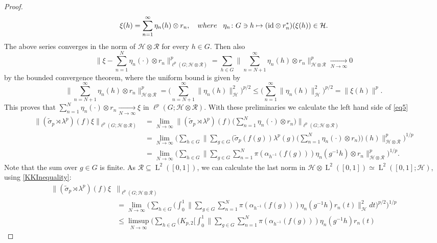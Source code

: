 \documentclass[10pt,a4paper]{amsart}
\DeclareMathOperator{\LL}{L}
\newcommand{\mc}{\mathcal}
\newcommand{\md}{d}
\newcommand{\wt}{\widetilde}
\begin{document}
\begin{proof}
\[
\xi(h)=
\sum_{n=1}^{\infty}  \eta_n(h)\otimes r_n,\quad
\textnormal{where}\;\;\;
\eta_n\colon G\ni h\mapsto(\mathrm{id}\otimes   r_n^*) (\xi(h))\in \mc{H}.
\]
The above series converges in the norm of $\mc{H}\otimes \mc{R}$ for every $h\in G$. Then also
\[
\bigl\|\xi-\sum_{n=1}^{N} \eta_n(\cdot)\otimes r_n\bigr\|_{\ell^p(G;\mc{H}\otimes\mc{R})}^p
=
\sum_{h\in G} \bigl\|
\sum_{n=N+1}^{\infty} \eta_n(h)\otimes r_n\bigr\|_{\mc{H}\otimes \mc{R}}^p \xrightarrow[N\to\infty]{}0
\]
by the bounded convergence theorem, where the uniform bound is given by
\[
\bigl\|
\sum_{n=N+1}^{\infty} \eta_n(h)\otimes r_n\bigr\|_{\mc{H}\otimes \mc{R}}^p=
\bigl(\sum_{n=N+1}^{\infty} \bigl\|\eta_n(h)\bigr\|_{\mc{H}}^{2 }\bigr)^{p/2}\le
\bigl(\sum_{n=1}^{\infty} \bigl\|\eta_n(h)\bigr\|_{\mc{H}}^{2}\bigr)^{p/2}=
\|\xi(h)\|^{p}.
\]
This proves that $\sum_{n=1}^{N} \eta_n(\cdot)\otimes r_n\xrightarrow[N\to\infty]{}\xi$ in $\ell^p(G;\mc{H}\otimes\mc{R})$. With these preliminaries we calculate the left hand side of \eqref{eq5}
\begin{align*}
\|(\wt{\sigma}_p\rtimes\lambda^p)(f) \xi\|_{\ell^p(G;\mc{H}\otimes \mc{R})}&=
\lim_{N\to\infty}
\bigl\|(\wt{\sigma}_p\rtimes\lambda^p)(f)
\bigl(
\sum_{n=1}^{N} \eta_n(\cdot)\otimes r_n
\bigr)
\bigr\|_{\ell^p(G;\mc{H}\otimes \mc{R})}
\\
&=
\lim_{N\to\infty}
\bigl(
\sum_{h\in G}
\bigl\|
\sum_{g\in G}
\bigl(
\wt{\sigma}_p(f(g))\lambda^p(g)
\bigl(\sum_{n=1}^{N}\eta_n(\cdot)\otimes r_n\bigr)
\bigr)(h)\bigr\|^p_{\mc{H}\otimes\mc{R}}\bigr)^{1/p}\\
&=
\lim_{N\to\infty}
\bigl(
\sum_{h\in G}
\bigl\|
\sum_{g\in G}
\sum_{n=1}^{N}
 \pi (\alpha_{h^{-1}}(f(g)))
\eta_n(g^{-1}h)\otimes r_n
\bigr\|^p_{\mc{H}\otimes\mc{R}}\bigr)^{1/p}.
\end{align*}
Note that the sum over $g\in G$ is finite. As $\mc{R}\subseteq \LL^2([0,1])$, we can calculate the last norm in $\mc{H}\otimes \LL^2([0,1])\simeq \LL^2([0,1]; \mc{H})$, using \eqref{KKInequality}:
\begin{align*}
\|(\wt{\sigma}_p\rtimes\lambda^p)(f) \xi&\|_{\ell^p(G;\mc{H}\otimes \mc{R})}\\
&= \lim_{N\to\infty}
\bigl(
\sum_{h\in G}
\bigl(
\int_{0}^{1}
\bigl\|
\sum_{g\in G}
\sum_{n=1}^{N}
 \pi (\alpha_{h^{-1}}(f(g)))
\eta_n(g^{-1}h)r_n(t)
\bigr\|^2_{\mc{H}}
\md t
\bigr)^{p/2}\bigr)^{1/p}\\
&\le
\limsup_{N\to\infty}
\bigl(
\sum_{h\in G}
\bigl(
K_{p,2}
\bigl[
\int_{0}^{1}
\bigl\|
\sum_{g\in G}
\sum_{n=1}^{N}
 \pi(\alpha_{h^{-1}}(f(g)))
\eta_n(g^{-1}h)r_n(t)

\end{align*}
\end{proof}
\end{document}
